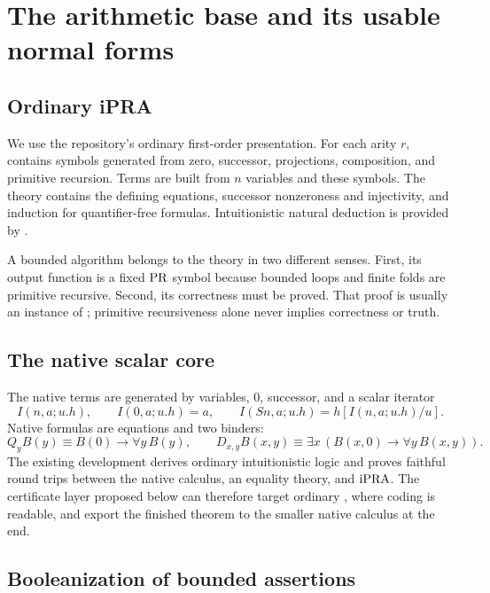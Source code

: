 \section{The arithmetic base and its usable normal forms}
\label{sec:base}

\subsection{Ordinary iPRA}

We use the repository's ordinary first-order presentation.  For each arity
\(r\),  contains symbols generated from zero, successor,
projections, composition, and primitive recursion.  Terms  are
built from \(n\) variables and these symbols.  The theory 
contains the defining equations, successor nonzeroness and injectivity, and
induction for quantifier-free formulas.  Intuitionistic natural deduction is
provided by .

A bounded algorithm belongs to the theory in two different senses.  First, its
output function is a fixed \(\mathrm{PR}\) symbol because bounded loops and finite
folds are primitive recursive.  Second, its correctness must be proved.  That
proof is usually an instance of ; primitive recursiveness alone
never implies correctness or truth.

\subsection{The native scalar core}

The native terms are generated by variables, \(0\), successor, and a scalar
iterator
\[
 I(n,a;u.h),\qquad
 I(0,a;u.h)=a,\qquad
 I(Sn,a;u.h)=h[I(n,a;u.h)/u].
\]
Native formulas are equations and two binders:
\[
 Q_y B(y)\equiv B(0)\to\forall y\,B(y),\qquad
 D_{x,y}B(x,y)\equiv\exists x\,(B(x,0)\to\forall y\,B(x,y)).
\]
The existing development derives ordinary intuitionistic logic and proves
faithful round trips between the native calculus, an equality theory, and
\(\mathrm{iPRA}\).  The certificate layer proposed below can therefore target ordinary
, where coding is readable, and export the finished theorem to the
smaller native calculus at the end.

\subsection{Booleanization of bounded assertions}

